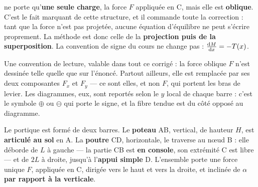 




\Sq{} ne porte qu'\textbf{une seule charge}, la force $F$ appliquée en C, mais elle est \textbf{oblique}. C'est le fait marquant de cette structure, et il commande toute la correction : tant que la force n'est pas projetée, aucune équation d'équilibre ne peut s'écrire proprement. La méthode est donc celle de la \textbf{projection puis de la superposition}. La convention de signe du cours ne change pas : $\frac{\mathrm{d}M}{\mathrm{d}x} = -T(x)$.

Une convention de lecture, valable dans tout ce corrigé : la force oblique $F$ n'est dessinée telle quelle que sur l'énoncé. Partout ailleurs, elle est remplacée par ses deux composantes $F_x$ et $F_y$ — ce sont elles, et non $F$, qui portent les bras de levier. Les diagrammes, eux, sont reportés selon le $y$ local de chaque barre : c'est le symbole $\oplus$ ou $\ominus$ qui porte le signe, et la fibre tendue est du côté opposé au diagramme.


Le portique \Sq{} est formé de deux barres. Le \textbf{poteau} AB, vertical, de hauteur $H$, est \textbf{articulé au sol} en A. La \textbf{poutre} CD, horizontale, le traverse au nœud B : elle déborde de $L$ à gauche — la partie CB est \textbf{en console}, son extrémité C est libre — et de $2L$ à droite, jusqu'à l'\textbf{appui simple} D. L'ensemble porte une force unique $F$, appliquée en C, dirigée vers le haut et vers la droite, et inclinée de $\alpha$ \textbf{par rapport à la verticale}.

